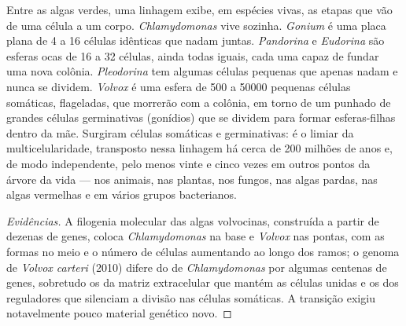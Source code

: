 \begin{proposition}\label{prop:b2:unicellular-diversity:volvox}
Entre as algas verdes, uma linhagem exibe, em espécies vivas, as
etapas que vão de uma célula a um corpo. \emph{Chlamydomonas} vive
sozinha. \emph{Gonium} é uma placa plana de 4 a 16 células idênticas
que nadam juntas. \emph{Pandorina} e \emph{Eudorina} são esferas ocas
de 16 a 32 células, ainda todas iguais, cada uma capaz de fundar uma
nova colônia. \emph{Pleodorina} tem algumas células pequenas que
apenas nadam e nunca se dividem. \emph{Volvox} é uma esfera de
\num{500} a \num{50000} pequenas células somáticas, flageladas, que
morrerão com a colônia, em torno de um punhado de grandes células
germinativas (gonídios) que se dividem para formar esferas-filhas
dentro da mãe. Surgiram células somáticas e germinativas: é o limiar
da multicelularidade, transposto nessa linhagem há cerca de
\num{200} milhões de anos e, de modo independente, pelo menos
vinte e cinco vezes em outros pontos da árvore da vida --- nos animais,
nas plantas, nos fungos, nas algas pardas, nas algas vermelhas e em
vários grupos bacterianos.
\end{proposition}
\begin{proof}[Evidências]
A filogenia molecular das algas volvocinas, construída a partir de
dezenas de genes, coloca \emph{Chlamydomonas} na base e \emph{Volvox}
nas pontas, com as formas  no meio e o número de células
aumentando ao longo dos ramos; o genoma de \emph{Volvox carteri}
(2010) difere do de \emph{Chlamydomonas} por algumas centenas de
genes, sobretudo os da matriz extracelular que mantém as células
unidas e os dos reguladores que silenciam a divisão nas células
somáticas. A transição exigiu notavelmente pouco material genético
novo.
\end{proof}

